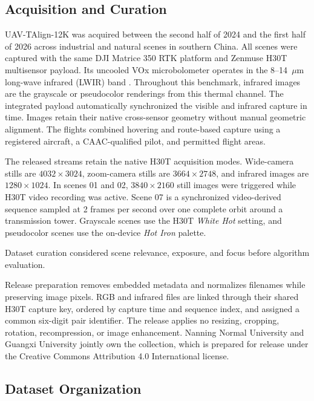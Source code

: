 \subsection{Acquisition and Curation}

UAV-TAlign-12K was acquired between the second half of 2024 and the first half of 2026 across
industrial and natural scenes in southern China. All scenes were captured with the same DJI
Matrice 350 RTK platform and Zenmuse H30T multisensor payload. Its uncooled VOx microbolometer
operates in the 8--14~$\mu$m long-wave infrared (LWIR) band \cite{dji_h30_specs}.
Throughout this benchmark, infrared images are the grayscale or pseudocolor renderings
from this thermal channel. The integrated payload
automatically synchronized the visible and infrared capture in time. Images retain their native
cross-sensor geometry without manual geometric alignment. The flights combined hovering and route-based capture using a registered aircraft, a
CAAC-qualified pilot, and permitted flight areas.

The released streams retain the native H30T acquisition modes. Wide-camera stills are
$4032\!\times\!3024$, zoom-camera stills are $3664\!\times\!2748$, and infrared images are
$1280\!\times\!1024$. In scenes 01 and 02, $3840\!\times\!2160$ still images were triggered while
H30T video recording was active. Scene 07 is a synchronized video-derived sequence sampled at
2 frames per second over one complete orbit around a transmission tower. Grayscale scenes use the
H30T \emph{White Hot} setting, and pseudocolor scenes use the on-device \emph{Hot Iron} palette.

Dataset curation considered scene relevance, exposure, and focus before algorithm evaluation.

Release preparation removes embedded metadata and normalizes filenames while preserving image
pixels. RGB and infrared files are linked through their shared H30T capture key, ordered by capture
time and sequence index, and assigned a common six-digit pair identifier. The release applies no
resizing, cropping, rotation, recompression, or image enhancement. Nanning Normal University
and Guangxi University jointly own the collection, which is prepared for release under the Creative Commons Attribution 4.0 International
license.

\subsection{Dataset Organization}

